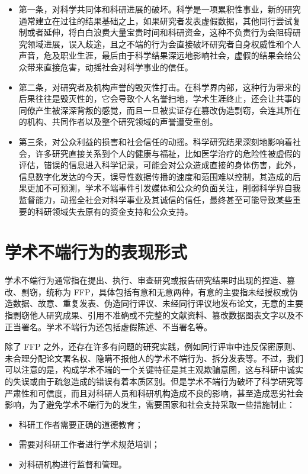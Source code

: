 \documentclass[12pt, hyperref, a4paper, UTF8]{ctexart}
\begin{document}
\begin{itemize}
    \item 第一条，对科学共同体和科研进展的破坏。科学是一项累积性事业，新的研究通常建立在过往的结果基础之上，如果研究者发表虚假数据，其他同行尝试复制或者延伸，将白白浪费大量宝贵时间和科研资金，这种不负责行为会阻碍研究领域进展，误入歧途，且之不端的行为会直接破坏研究者自身权威性和个人声音，危及职业生涯，最后由于科学结果深远地影响社会，虚假的结果会给公众带来直接危害，动摇社会对科学事业的信任。
    \item 第二条，对研究者及机构声誉的毁灭性打击。在科学界内部，这种行为带来的后果往往是毁灭性的，它会导致个人名誉扫地，学术生涯终止，还会让共事的同僚产生被深深背叛的感觉，而且一旦被实证存在篡改伪造剽窃，会连其所在的机构、共同作者以及整个研究领域的声誉遭受重创。
    \item 第三条，对公众利益的损害和社会信任的动摇。科学研究结果深刻地影响着社会，许多研究直接关系到个人的健康与福祉，比如医学治疗的危险性被虚假的评估，错误的信息进入科学记录，可能会对公众造成直接的身体伤害，此外，信息数字化发达的今天，误导性数据传播的速度和范围难以控制，其造成的后果更加不可预测，学术不端事件引发媒体和公众的负面关注，削弱科学界自我监督能力，动摇全社会对科学事业及其诚信的信任，最终甚至可能导致某些重要的科研领域失去原有的资金支持和公众支持。
\end{itemize}



\section{学术不端行为的表现形式}
学术不端行为通常指在提出、执行、审查研究或报告研究结果时出现的捏造、篡改、剽窃，统称为 FFP，具体包括有意和无意两种，有意的主要指未经授权或伪造数据、故意、重复发表、伪造同行评议、未经同行评议地发布论文，无意的主要指剽窃他人研究成果、引用不准确或不完整的文献资料、篡改数据图表文字以及不正当署名。学术不端行为还包括虚假陈述、不当署名等。

除了 FFP 之外，还存在许多有问题的研究实践，例如同行评审中违反保密原则、未合理分配论文署名权、隐瞒不报他人的学术不端行为、拆分发表等。不过，我们可以注意的是，构成学术不端的一个关键特征是其主观欺骗意图，这与科研中诚实的失误或由于疏忽造成的错误有着本质区别。但是学术不端行为破坏了科学研究等严肃性和可信度，而且对科研人员和科研机构造成不良的影响，甚至造成恶劣社会影响，为了避免学术不端行为的发生，需要国家和社会支持采取一些措施制止：

\begin{itemize}
    \item 科研工作者需要正确的道德教育；
    \item 需要对科研工作者进行学术规范培训；
    \item 对科研机构进行监督和管理。
\end{itemize}
\end{document}
